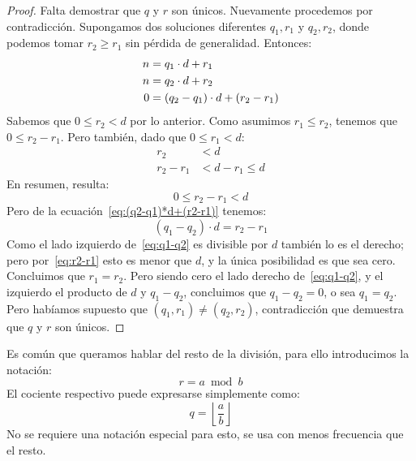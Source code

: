\begin{proof}
    Falta demostrar que \(q\) y \(r\) son únicos.
    Nuevamente procedemos por contradicción.%
    Supongamos dos soluciones diferentes \(q_1, r_1\) y \(q_2, r_2\),
    donde podemos tomar \(r_2 \ge r_1\) sin pérdida de generalidad.
    Entonces:
    \begin{align}
      n
	&= q_1 \cdot d + r_1 \notag \\
      n
	&= q_2 \cdot d + r_2 \notag \\
      0
	&= (q_2 - q_1) \cdot d + (r_2 - r_1) \label{eq:(q2-q1)*d+(r2-r1)}
    \end{align}
    Sabemos que \(0 \le r_2 < d\) por lo anterior.
    Como asumimos \(r_1 \le r_2\),
    tenemos que \(0 \le r_2 - r_1\).
    Pero también,
    dado que \(0 \le r_1 < d\):
    \begin{align*}
      r_2
	&< d \\
      r_2 - r_1
	&< d - r_1
	  \le d
    \end{align*}
    En resumen,
    resulta:
    \begin{equation}
      \label{eq:r2-r1}
      0 \le r_2 - r_1 < d
    \end{equation}
    Pero de la ecuación~\eqref{eq:(q2-q1)*d+(r2-r1)} tenemos:
    \begin{equation}
      \label{eq:q1-q2}
      (q_1 - q_2) \cdot d
	= r_2 - r_1
    \end{equation}
    Como el lado izquierdo de~\eqref{eq:q1-q2} es divisible por \(d\)
    también lo es el derecho;
    pero por~\eqref{eq:r2-r1} esto es menor que \(d\),
    y la única posibilidad es que sea cero.
    Concluimos que \(r_1 = r_2\).
    Pero siendo cero el lado derecho de~\eqref{eq:q1-q2},
    y el izquierdo el producto de \(d\)
    y \(q_1 - q_2\),
    concluimos que \(q_1 - q_2 = 0\),
    o sea \(q_1 = q_2\).
    Pero habíamos supuesto que \((q_1, r_1) \ne (q_2, r_2)\),
    contradicción que demuestra que \(q\) y \(r\) son únicos.
  \end{proof}

  Es común que queramos hablar del resto de la división,%
  para ello introducimos la notación:
  \begin{equation*}
    r = a \bmod b
  \end{equation*}
  El cociente respectivo puede expresarse simplemente como:%
  \begin{equation*}
    q = \left\lfloor \frac{a}{b} \right\rfloor
  \end{equation*}
  No se requiere una notación especial para esto,
  se usa con menos frecuencia que el resto.

